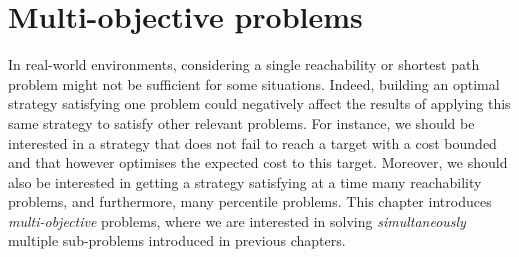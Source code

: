 \chapter{Multi-objective problems}
In real-world environments, considering a single reachability or shortest path problem might not be sufficient for some situations.
Indeed, building an optimal strategy satisfying one problem could negatively affect the results of applying this same strategy to satisfy other relevant problems.
For instance, we should be interested in a strategy that does not fail to reach a target with a cost bounded and that however optimises the expected cost to this target.
Moreover, we should also be interested in getting a strategy satisfying at a time many reachability problems, and furthermore, many percentile problems.
This chapter introduces \textit{multi-objective} problems, where we are interested in solving \textit{simultaneously} multiple sub-problems introduced in previous chapters.
